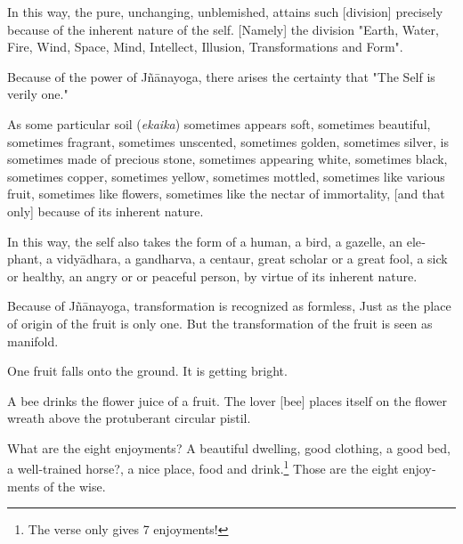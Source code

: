 \begin{otherlanguage}{english}
\begin{tlate}
\noindent In this way, the pure, unchanging, unblemished, attains such [division] precisely because of the inherent nature of the self. [Namely] the division "Earth, Water, Fire, Wind, Space, Mind, Intellect, Illusion, Transformations and Form".
\end{tlate}
\begin{tlate}
Because of the power of Jñānayoga, there arises the certainty that "The Self is verily one."
\end{tlate}
\begin{tlate}
As some particular soil (\textit{ekaika}) sometimes appears soft, sometimes beautiful, sometimes fragrant, sometimes unscented, sometimes golden, sometimes silver, is sometimes made of precious stone, sometimes appearing white, sometimes black, sometimes copper, sometimes yellow, sometimes mottled, sometimes like various fruit, sometimes like flowers, sometimes like the nectar of immortality, [and that only] because of its inherent nature.  
\end{tlate}
\begin{tlate}
In this way, the self also takes the form of a human, a bird, a gazelle, an elephant, a vidyādhara, a gandharva, a centaur, great scholar or a great fool, a sick or healthy, an angry or or peaceful person, by virtue of its inherent nature. 
\end{tlate}
\begin{tlate}
Because of Jñānayoga, transformation is recognized as formless, Just as the place of origin of the fruit is only one. But the transformation of the fruit is seen as manifold. 
\end{tlate}
\begin{tlate}
One fruit falls onto the ground. It is getting bright. 
\end{tlate}
\begin{tlate}
A bee drinks the flower juice of a fruit. The lover [bee] places itself on the flower wreath above the protuberant circular pistil.
\end{tlate}
\begin{tlate}
  What are the eight enjoyments?  \hfill \break
  A beautiful dwelling, good clothing, a good bed, a well-trained horse?, a nice place, food and drink.\footnote{The verse only gives 7 enjoyments!} Those are the eight enjoyments of the wise.

\end{tlate}
\end{otherlanguage}
